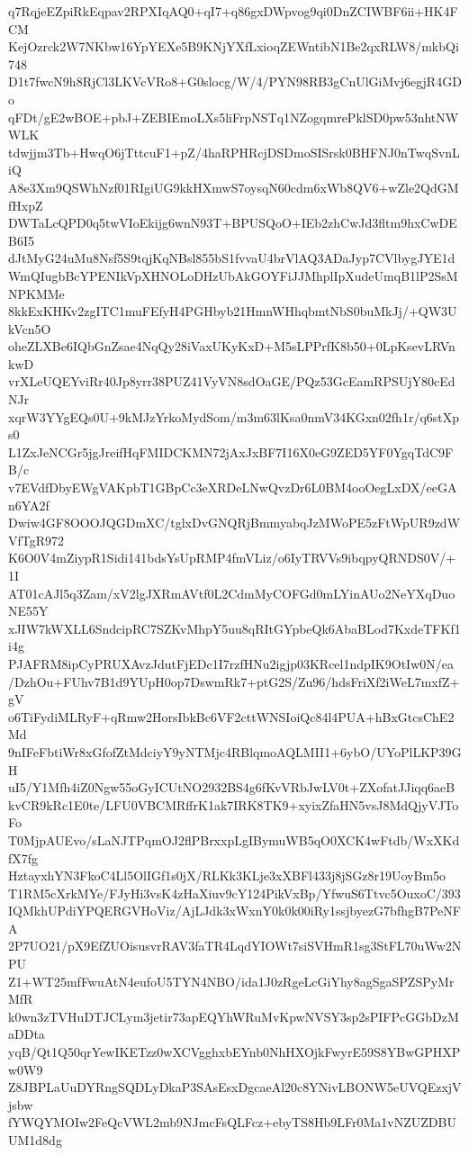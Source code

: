 q7RqjeEZpiRkEqpav2RPXIqAQ0+qI7+q86gxDWpvog9qi0DnZCIWBF6ii+HK4FCM
KejOzrck2W7NKbw16YpYEXe5B9KNjYXfLxioqZEWntibN1Be2qxRLW8/mkbQi748
D1t7fwcN9h8RjCl3LKVcVRo8+G0slocg/W/4/PYN98RB3gCnUlGiMvj6egjR4GDo
qFDt/gE2wBOE+pbJ+ZEBIEmoLXs5liFrpNSTq1NZogqmrePklSD0pw53nhtNWWLK
tdwjjm3Tb+HwqO6jTttcuF1+pZ/4haRPHRcjDSDmoSISrsk0BHFNJ0nTwqSvnLiQ
A8e3Xm9QSWhNzf01RIgiUG9kkHXmwS7oysqN60cdm6xWb8QV6+wZle2QdGMfHxpZ
DWTaLcQPD0q5twVIoEkijg6wnN93T+BPUSQoO+IEb2zhCwJd3fltm9hxCwDEB6I5
dJtMyG24uMu8Nsf5S9tqjKqNBsl855bS1fvvaU4brVlAQ3ADaJyp7CVlbygJYE1d
WmQIugbBcYPENIkVpXHNOLoDHzUbAkGOYFiJJMhplIpXudeUmqB1lP2SsMNPKMMe
8kkExKHKv2zgITC1muFEfyH4PGHbyb21HmnWHhqbmtNbS0buMkJj/+QW3UkVcn5O
oheZLXBe6IQbGnZsae4NqQy28iVaxUKyKxD+M5sLPPrfK8b50+0LpKsevLRVnkwD
vrXLeUQEYviRr40Jp8yrr38PUZ41VyVN8sdOaGE/PQz53GcEamRPSUjY80cEdNJr
xqrW3YYgEQs0U+9kMJzYrkoMydSom/m3m63lKsa0nmV34KGxn02fh1r/q6stXps0
L1ZxJeNCGr5jgJreifHqFMIDCKMN72jAxJxBF7I16X0eG9ZED5YF0YgqTdC9FB/c
v7EVdfDbyEWgVAKpbT1GBpCc3eXRDeLNwQvzDr6L0BM4ooOegLxDX/eeGAn6YA2f
Dwiw4GF8OOOJQGDmXC/tglxDvGNQRjBmmyabqJzMWoPE5zFtWpUR9zdWVfTgR972
K6O0V4mZiypR1Sidi141bdsYsUpRMP4fmVLiz/o6IyTRVVs9ibqpyQRNDS0V/+1I
AT01cAJl5q3Zam/xV2lgJXRmAVtf0L2CdmMyCOFGd0mLYinAUo2NeYXqDuoNE55Y
xJIW7kWXLL6SndcipRC7SZKvMhpY5uu8qRItGYpbeQk6AbaBLod7KxdeTFKf1i4g
PJAFRM8ipCyPRUXAvzJdutFjEDc1I7rzfHNu2igjp03KRcel1ndpIK9OtIw0N/ea
/DzhOu+FUhv7B1d9YUpH0op7DswmRk7+ptG2S/Zu96/hdsFriXf2iWeL7mxfZ+gV
o6TiFydiMLRyF+qRmw2HorsIbkBc6VF2cttWNSIoiQc84l4PUA+hBxGtcsChE2Md
9nIFeFbtiWr8xGfofZtMdciyY9yNTMjc4RBlqmoAQLMII1+6ybO/UYoPlLKP39GH
uI5/Y1Mfh4iZ0Ngw55oGyICUtNO2932BS4g6fKvVRbJwLV0t+ZXofatJJiqq6aeB
kvCR9kRc1E0te/LFU0VBCMRffrK1ak7IRK8TK9+xyixZfaHN5vsJ8MdQjyVJToFo
T0MjpAUEvo/sLaNJTPqmOJ2flPBrxxpLgIBymuWB5qO0XCK4wFtdb/WxXKdfX7fg
HztayxhYN3FkoC4Ll5OlIGf1s0jX/RLKk3KLje3xXBFl433j8jSGz8r19UoyBm5o
T1RM5cXrkMYe/FJyHi3vsK4zHaXiuv9cY124PikVxBp/YfwuS6Ttvc5OuxoC/393
IQMkhUPdiYPQERGVHoViz/AjLJdk3xWxnY0k0k00iRy1ssjbyezG7bfhgB7PeNFA
2P7UO21/pX9EfZUOisusvrRAV3faTR4LqdYIOWt7siSVHmR1sg3StFL70uWw2NPU
Z1+WT25mfFwuAtN4eufoU5TYN4NBO/ida1J0zRgeLcGiYhy8agSgaSPZSPyMrMfR
k0wn3zTVHuDTJCLym3jetir73apEQYhWRuMvKpwNVSY3sp2sPIFPcGGbDzMaDDta
yqB/Qt1Q50qrYewIKETzz0wXCVgghxbEYnb0NhHXOjkFwyrE59S8YBwGPHXPw0W9
Z8JBPLaUuDYRngSQDLyDkaP3SAsEsxDgcaeAl20c8YNivLBONW5eUVQEzxjVjsbw
fYWQYMOIw2FeQcVWL2mb9NJmcFsQLFcz+ebyTS8Hb9LFr0Ma1vNZUZDBUUM1d8dg
